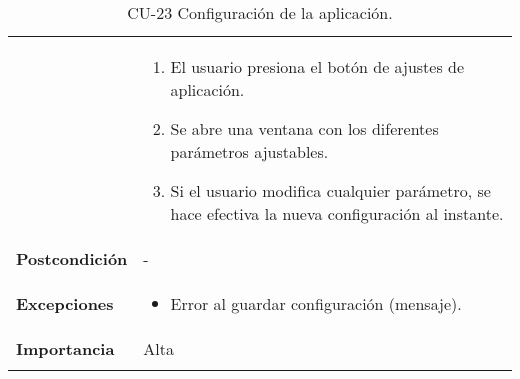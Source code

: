 \begin{longtable}[H]{@{}ll@{}}
\begin{minipage}[t]{0.26\columnwidth}
\end{minipage} & \begin{minipage}[t]{0.68\columnwidth}\raggedright\strut
\begin{enumerate}
\def\labelenumi{\arabic{enumi}.}
\tightlist
\item
  El usuario presiona el botón de ajustes de aplicación.
\item
  Se abre una ventana con los diferentes parámetros ajustables.
\item
  Si el usuario modifica cualquier parámetro, se hace efectiva la nueva
  configuración al instante.
\end{enumerate}\strut
\end{minipage}\tabularnewline
\begin{minipage}[t]{0.26\columnwidth}\raggedright\strut
\textbf{Postcondición}\strut
\end{minipage} & \begin{minipage}[t]{0.68\columnwidth}\raggedright\strut
-\strut
\end{minipage}\tabularnewline
\begin{minipage}[t]{0.26\columnwidth}\raggedright\strut
\textbf{Excepciones}\strut
\end{minipage} & \begin{minipage}[t]{0.68\columnwidth}\raggedright\strut
\begin{itemize}
\tightlist
\item
  Error al guardar configuración (mensaje).
\end{itemize}\strut
\end{minipage}\tabularnewline
\begin{minipage}[t]{0.26\columnwidth}\raggedright\strut
\textbf{Importancia}\strut
\end{minipage} & \begin{minipage}[t]{0.68\columnwidth}\raggedright\strut
Alta\strut
\end{minipage}\tabularnewline
\bottomrule
\caption{CU-23 Configuración de la aplicación.}
\end{longtable}


